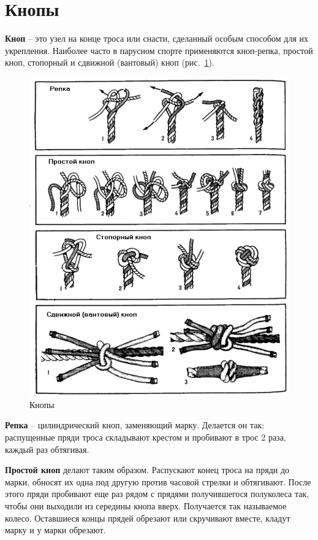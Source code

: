 \documentclass[a4paper, 12pt, twoside, final]{scrbook}
\begin{document}
\section{Кнопы}

\textbf{Кноп} \--- это узел на конце троса или снасти, сделанный особым способом для их укрепления. Наиболее часто в парусном спорте применяются кноп-репка, простой кноп, стопорный и сдвижной (вантовый) кноп (рис.~\ref{fig:69}).

\begin{figure}[htbp]
   \centering
   \includegraphics{69_Knopy} %
   \caption{Кнопы}
   \label{fig:69}
\end{figure}

\textbf{Репка} \--- цилиндрический кноп, заменяющий марку. Делается он так: распущенные пряди троса складывают крестом и пробивают в трос 2 раза, каждый раз обтягивая.

\textbf{Простой кноп} делают таким образом. Распускают конец троса на пряди до марки, обносят их одна под другую против часовой стрелки и обтягивают. После этого пряди пробивают еще раз рядом с прядями получившегося полуколеса так, чтобы они выходили из середины кнопа вверх. Получается так называемое колесо. Оставшиеся концы прядей обрезают или скручивают вместе, кладут марку и у марки обрезают.
\end{document}
